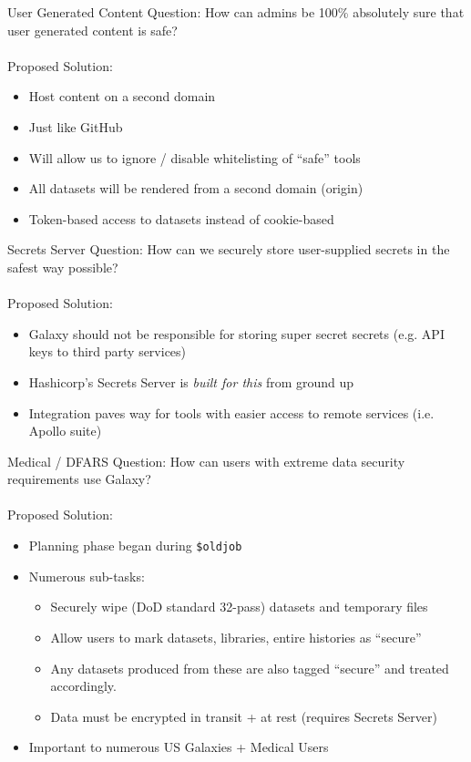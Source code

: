 \documentclass[12pt]{ufrslides}
\begin{document}
	\begin{frame}{User Generated Content}
		Question: How can admins be 100\% absolutely sure that user generated content is safe?\\ \ \\
		Proposed Solution:
		\begin{itemize}
			\item Host content on a second domain
			\item Just like GitHub
			\item Will allow us to ignore / disable whitelisting of ``safe'' tools
			\item All datasets will be rendered from a second domain (origin)
			\item Token-based access to datasets instead of cookie-based
		\end{itemize}
	\end{frame}

	\begin{frame}{Secrets Server}
		Question: How can we securely store user-supplied secrets in the safest way possible?\\ \ \\
		Proposed Solution:
		\begin{itemize}
			\item Galaxy should not be responsible for storing super secret secrets (e.g. API keys to third party services)
			\item Hashicorp's Secrets Server is \emph{built for this} from ground up
			\item Integration paves way for tools with easier access to remote services (i.e. Apollo suite)
		\end{itemize}
	\end{frame}

	\begin{frame}{Medical / DFARS}
		Question: How can users with extreme data security requirements use Galaxy?\\ \ \\
		Proposed Solution:
		\begin{itemize}
			\item Planning phase began during \texttt{\$oldjob}
			\item Numerous sub-tasks:
			\begin{itemize}
				\item Securely wipe (DoD standard 32-pass) datasets and temporary files
				\item Allow users to mark datasets, libraries, entire histories as ``secure''
				\item Any datasets produced from these are also tagged ``secure'' and treated accordingly.
				\item Data must be encrypted in transit + at rest (requires Secrets Server)
			\end{itemize}
			\item Important to numerous US Galaxies + Medical Users
		\end{itemize}
	\end{frame}
\end{document}
